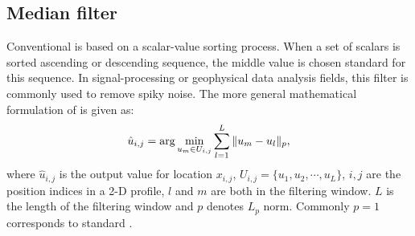 
\subsection{Median filter}
Conventional  is based on a scalar-value sorting process. When a set of scalars is sorted  ascending or descending sequence, the middle value is chosen  standard for this sequence. In signal-processing or geophysical data analysis fields, this filter is commonly used to remove spiky noise. The more general mathematical formulation of   is given as:
\begin{equation}
\label{eq:mf1}
\hat{u}_{i,j}=\arg\min_{u_m\in U_{i,j}}\sum_{l=1}^{L}\Arrowvert u_m-u_l \Arrowvert_p,
\end{equation}
where $\hat{u}_{i,j}$ is the output value for location $x_{i,j}$, $U_{i,j}=\{u_1,u_2,\cdots,u_L\}$, $i,j$ are the position indices in a 2-D profile,  $l$ and $m$ are both  in the filtering window. $L$ is the length of the filtering window\new{,} and $p$ denotes $L_p$ norm. Commonly $p=1$ corresponds to  standard . 

